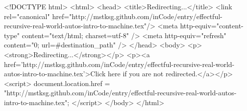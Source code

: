 <!DOCTYPE html>
<html>
<head>
<title>Redirecting...</title>
<link rel="canonical" href="http://mstksg.github.com/inCode/entry/effectful-recursive-real-world-autos-intro-to-machine.tex"/>
<meta http-equiv="content-type" content="text/html; charset=utf-8" />
<meta http-equiv="refresh" content="0; url=#{destination_path}" />
</head>
<body>
  <p><strong>Redirecting...</strong></p>
  <p><a href='http://mstksg.github.com/inCode/entry/effectful-recursive-real-world-autos-intro-to-machine.tex'>Click here if you are not redirected.</a></p>
  <script>
    document.location.href = "http://mstksg.github.com/inCode/entry/effectful-recursive-real-world-autos-intro-to-machine.tex";
  </script>
</body>
</html>
